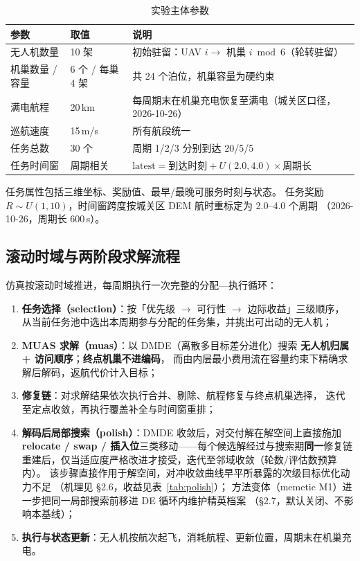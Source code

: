 \documentclass[a4paper,11pt]{article}
\begin{document}
\begin{table}[H]
\centering
\caption{实验主体参数}
\label{tab:entities}
\footnotesize
\begin{tabular}{@{}ll>{\raggedright\arraybackslash}p{7.6cm}@{}}
\toprule
参数 & 取值 & 说明 \\
\midrule
无人机数量 & 10 架 & 初始驻留：UAV $i \to$ 机巢 $i \bmod 6$（轮转驻留） \\
机巢数量 / 容量 & 6 个 / 每巢 4 架 & 共 24 个泊位，机巢容量为硬约束 \\
满电航程 & 20\,km & 每周期末在机巢充电恢复至满电（城关区口径，2026-10-26） \\
巡航速度 & 15\,m/s & 所有航段统一 \\
任务总数 & 30 个 & 周期 1/2/3 分别到达 20/5/5 \\
任务时间窗 & 周期相关 & $\text{latest}=\text{到达时刻}+U(2.0,4.0)\times\text{周期长}$ \\
\bottomrule
\end{tabular}
\end{table}

任务属性包括三维坐标、奖励值、最早/最晚可服务时刻与状态。
任务奖励 $R\sim U(1,10)$，时间窗跨度按城关区 DEM 航时重标定为 2.0--4.0 个周期
（2026-10-26，周期长 600\,s）。

\subsection{滚动时域与两阶段求解流程}

仿真按滚动时域推进，每周期执行一次完整的分配—执行循环：

\begin{enumerate}
  \item \textbf{任务选择（selection）}：按「优先级 $\to$ 可行性 $\to$ 边际收益」三级顺序，
        从当前任务池中选出本周期参与分配的任务集，并挑出可出动的无人机；
  \item \textbf{MUAS 求解（muas）}：以 DMDE（离散多目标差分进化）搜索
        \textbf{无人机归属 + 访问顺序}；\textbf{终点机巢不进编码}，
        而由内层最小费用流在容量约束下精确求解后解码，返航代价计入目标；
  \item \textbf{修复链}：对求解结果依次执行合并、剔除、航程修复与终点机巢选择，
        迭代至定点收敛，再执行覆盖补全与时间窗重排；
  \item \textbf{解码后局部搜索（polish）}：DMDE 收敛后，对交付解在解空间上直接施加
        \textbf{relocate / swap / 插入位}三类移动——每个候选解经过与搜索期\textbf{同一}修复链
        重建后，仅当适应度严格改进才接受，迭代至邻域收敛（轮数/评估数预算内）。
        该步骤直接作用于解空间，对冲收敛曲线早平所暴露的次级目标优化动力不足
        （机理见 \S 2.6，收益见表~\ref{tab:polish}）；
        方法变体（memetic M1）进一步把同一局部搜索前移进 DE 循环内维护精英档案
        （\S 2.7，默认关闭、不影响本基线）；
  \item \textbf{执行与状态更新}：无人机按航次起飞，消耗航程、更新位置，周期末在机巢充电。
\end{enumerate}
\end{document}
